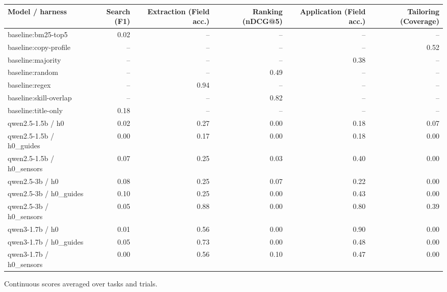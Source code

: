 {\small
\begin{adjustbox}{max width=\linewidth}
\begin{tabular}{lrrrrr}
\toprule
Model / harness & Search (F1) & Extraction (Field acc.) & Ranking (nDCG@5) & Application (Field acc.) & Tailoring (Coverage) \\
\midrule
baseline:bm25-top5 & 0.02 & -- & -- & -- & -- \\
baseline:copy-profile & -- & -- & -- & -- & 0.52 \\
baseline:majority & -- & -- & -- & 0.38 & -- \\
baseline:random & -- & -- & 0.49 & -- & -- \\
baseline:regex & -- & 0.94 & -- & -- & -- \\
baseline:skill-overlap & -- & -- & 0.82 & -- & -- \\
baseline:title-only & 0.18 & -- & -- & -- & -- \\
qwen2.5-1.5b / h0 & 0.02 & 0.27 & 0.00 & 0.18 & 0.07 \\
qwen2.5-1.5b / h0\_guides & 0.00 & 0.17 & 0.00 & 0.18 & 0.00 \\
qwen2.5-1.5b / h0\_sensors & 0.07 & 0.25 & 0.03 & 0.40 & 0.00 \\
qwen2.5-3b / h0 & 0.08 & 0.25 & 0.07 & 0.22 & 0.00 \\
qwen2.5-3b / h0\_guides & 0.10 & 0.25 & 0.00 & 0.43 & 0.00 \\
qwen2.5-3b / h0\_sensors & 0.05 & 0.88 & 0.00 & 0.80 & 0.39 \\
qwen3-1.7b / h0 & 0.01 & 0.56 & 0.00 & 0.90 & 0.00 \\
qwen3-1.7b / h0\_guides & 0.05 & 0.73 & 0.00 & 0.48 & 0.00 \\
qwen3-1.7b / h0\_sensors & 0.00 & 0.56 & 0.10 & 0.47 & 0.00 \\
\bottomrule
\end{tabular}
\end{adjustbox}

\smallskip
{\footnotesize Continuous scores averaged over tasks and trials.\par}
}
